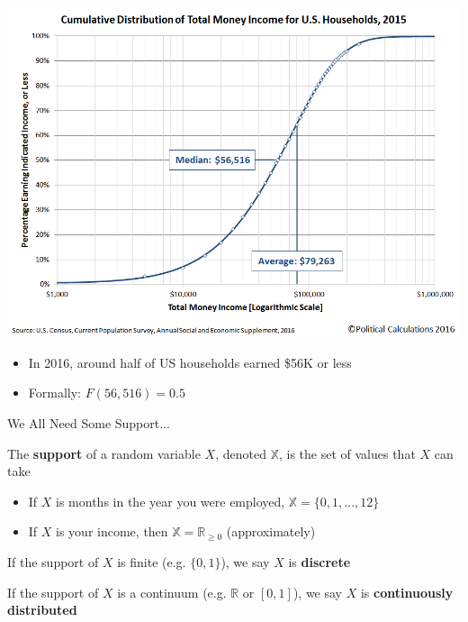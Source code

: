 \documentclass[11pt,english,handout]{beamer}
\newenvironment{wideitemize}{\itemize\addtolength{\itemsep}{10pt}}{\enditemize}
\begin{document}
\begin{frame}
	\centering
	\includegraphics[width = 0.8\linewidth]{cdf-income}
	
	\begin{itemize}
		\item
		In 2016, around half of US households earned \$56K or less\smallskip
\pause{}
		\item Formally: $F(56,516)=0.5$
	\end{itemize}
\end{frame}



\begin{frame}{We All Need Some Support...}
	
\begin{wideitemize}
	\item
	The \textbf{support} of a random variable $X$, denoted $\mathbb{X}$, is the set of values that $X$ can take
	
		\begin{itemize}
			\item 
			If $X$ is months in the year you were employed, $\mathbb{X} = \{0,1,...,12\}$
			
			\item
			If $X$ is your income, then $\mathbb{X} = \mathbb{R}_{\geq 0}$ (approximately)
		\end{itemize}
	\smallskip\pause{}

	\item
	If the support of $X$ is finite (e.g. $\{0,1\}$), we say $X$ is \textbf{discrete}
	
	\item
	If the support of $X$ is a continuum (e.g. $\mathbb{R}$ or $[0,1]$), we say $X$ is \textbf{continuously distributed} 
\end{wideitemize}

\end{frame}
\end{document}
